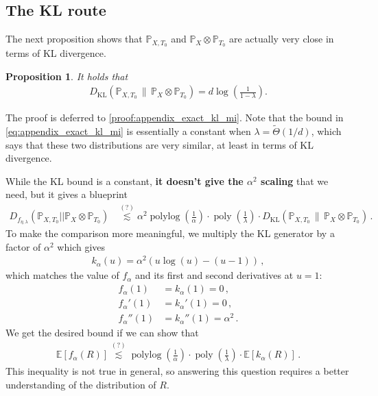 \documentclass{article}
\theoremstyle{plain}
\newtheorem{proposition}[theorem]{Proposition}
\theoremstyle{definition}
\theoremstyle{plain}
\newcommand{\E}{\mathbb E}
\newcommand{\PP}{\mathbb P}
\newcommand{\polylog}{\operatorname{polylog}}
\newcommand{\poly}{\operatorname{poly}}
\begin{document}
\subsection{The KL route}
The next proposition shows that $\PP_{X, T_0}$ and $\PP_X \otimes \PP_{T_0}$ are actually very close in terms of KL divergence.
\begin{proposition}
    \label{prop:appendix_exact_kl_mi}
    It holds that
    \begin{align}
        D_{\mathrm{KL}}(\PP_{X,T_0}\,\|\,\PP_X \otimes \PP_{T_0})
        = d\log\left(\frac{1}{1-\lambda}\right).
        \label{eq:appendix_exact_kl_mi}
    \end{align}
\end{proposition}
The proof is deferred to \cref{proof:appendix_exact_kl_mi}.
Note that the bound in \eqref{eq:appendix_exact_kl_mi} is essentially a constant when $\lambda=\tilde{\Theta}(1/d)$,
which says that these two distributions are very similar, at least in terms of KL divergence.

\noindent
While the KL bound is a constant, \textbf{it doesn't give the $\alpha^2$ scaling} that we need,
but it gives a blueprint
\begin{align}
    D_{f_{\eta, \lambda}}(\PP_{X, T_0} || \PP_X \otimes \PP_{T_0})
     & \stackrel{(?)}{\lesssim}
    \alpha^2 \polylog(\frac{1}{\alpha}) \cdot \poly(\frac{1}{\lambda}) \cdot D_{\mathrm{KL}}(\PP_{X,T_0}\,\|\,\PP_X \otimes \PP_{T_0})\,.
    \label{eq:blueprint}
\end{align}
To make the comparison more meaningful, we multiply the KL generator by a factor of $\alpha^2$ which gives
\begin{align}
    k_\alpha(u) = \alpha^2 \left(u\log(u) - (u - 1)\right)\,,
\end{align}
which matches the value of $f_\alpha$ and its first and second derivatives at $u=1$:
\begin{align}
    f_\alpha(1)   & = k_\alpha(1) = 0\,,          \\
    f_\alpha'(1)  & = k_\alpha'(1) = 0\,,         \\
    f_\alpha''(1) & = k_\alpha''(1) = \alpha^2\,.
\end{align}
We get the desired bound if we can show that
\begin{align}
    \E\left[
        f_\alpha(R)
        \right]
    \stackrel{(?)}{\lesssim}
    \polylog(\frac{1}{\alpha}) \cdot \poly(\frac{1}{\lambda}) \cdot
    \E\left[k_\alpha(R)\right]\,.
\end{align}
This inequality is not true in general, so answering this question requires a better understanding of the distribution of $R$.
\end{document}
